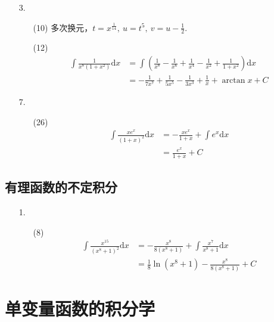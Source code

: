 \documentclass[11pt,oneside,fontset=fandol]{ctexbook} %
\begin{document}
\begin{enumerate}
    \item[3.]
    \begin{enumerate}
        \item[(10)]
        多次换元，$t = x^{\frac 1 {14}},\ u = t^{5},\ v = u - \frac 1 2$.
        \item[(12)]
        \begin{align*}
            \int \frac 1 {x^8(1+x^2)} \mathrm dx &= \int \left( \frac 1 {x^8} - \frac 1 {x^6} + \frac 1 {x^4} - \frac 1 {x^2} + \frac 1 {1+x^2} \right) \mathrm dx \\ &= - \frac 1 {7x^7} + \frac 1 {5x^5} - \frac 1 {3x^3} + \frac 1 x + \arctan x + C
        \end{align*}
    \end{enumerate}
    \item[7.]
    \begin{enumerate}
        \item[(26)]
        \begin{align*}
            \int \frac{xe^x}{(1+x)^2} \mathrm dx &= - \frac{xe^x}{1+x} + \int e^x \mathrm dx \\
            &= \frac{e^x}{1+x} + C
        \end{align*}
    \end{enumerate}
\end{enumerate}

\section{有理函数的不定积分}

\begin{enumerate}
    \item[1.]
    \begin{enumerate}
        \item[(8)]
        \begin{align*}
            \int \frac{x^{15}}{(x^8 + 1)^2} \mathrm dx &= - \frac{x^8}{8(x^8 + 1)} + \int \frac{x^7}{x^8 + 1} \mathrm dx \\
            &= \frac 1 8 \ln(x^8 + 1) - \frac{x^8}{8(x^8 + 1)} + C
        \end{align*}
    \end{enumerate}
\end{enumerate}

\newpage

\chapter{单变量函数的积分学}
\end{document}
